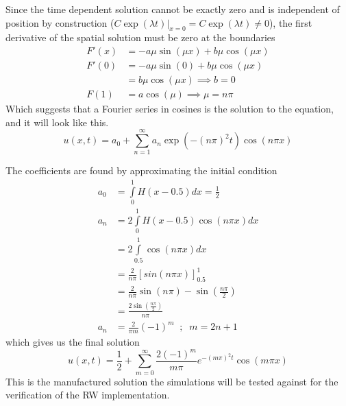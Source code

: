 Since the time dependent solution cannot be exactly zero and is independent of position by construction ($C\exp(\lambda t)|_{x=0} = C\exp(\lambda t) \neq 0$), the first derivative of the spatial solution must be zero at the boundaries
\begin{align*}
 F'(x) &= -a\mu\sin(\mu x) + b\mu\cos(\mu x) \\
 F'(0) &= -a \mu\sin(0) + b\mu\cos(\mu x) \\
 &= b\mu\cos(\mu x) \implies b=0 \\
 F(1) &= a\cos(\mu) \implies \mu = n\pi
\end{align*}
Which suggests that a Fourier series in cosines is the solution to the equation, and it will look like this.
\begin{equation}
 u(x,t) = a_0 + \sum\limits_{n=1}^\infty a_n\exp\left(-(n\pi)^2t\right)\cos(n\pi x)
\end{equation}

The coefficients are found by approximating the initial condition
\begin{align*}
 a_0 &= \int\limits_0^1H(x-0.5)dx = \frac{1}{2} \\
 a_n &= 2\int\limits_0^1H(x-0.5)\cos(n\pi x)dx \\
 &= 2\int\limits_{0.5}^1\cos(n\pi x)dx \\
 &= \frac{2}{n\pi}\left[sin(n\pi x)\right]_{0.5}^1 \\
 &= \frac{2}{n\pi}\sin(n\pi) - \sin(\frac{n\pi}{2}) \\
 &= \frac{2\sin(\frac{n\pi}{2})}{n\pi}\\
 a_n &= \frac{2}{\pi m} (-1)^m\;\;;\;\; m=2n+1
\end{align*}
which gives us the final solution
\begin{equation}
 u(x,t) = \frac{1}{2} + \sum\limits_{m=0}^\infty \frac{2(-1)^m}{m\pi}e^{-(m\pi)^2t}\cos(m\pi x)
\end{equation}
This is the manufactured solution the simulations will be tested against for the verification of the RW implementation.


% 
% 

